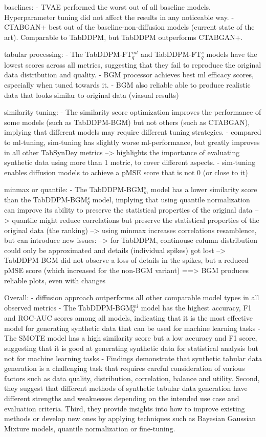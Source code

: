 baselines:
- TVAE performed the worst out of all baseline models. Hyperparameter tuning did not affect the results in any noticeable way.
- CTABGAN+ best out of the baseline-non-diffusion models (current state of the art). Comparable to TabDDPM, but TabDDPM outperforms CTABGAN+.


tabular processing:
- The TabDDPM-FT$^{ml}_q$ and TabDDPM-FT$^{s}_q$ models have the lowest scores across all metrics, suggesting that they fail to reproduce the original data distribution and quality.
- BGM processor achieves best ml efficacy scores, especially when tuned towards it.
- BGM also reliable able to produce realistic data that looks similar to original data (viasual results)


similarity tuning:
- The similarity score optimization improves the performance of some models (such as TabDDPM-BGM) but not others (such as CTABGAN), implying that different models may require different tuning strategies.
- compared to ml-tuning, sim-tuning has slightly worse ml-performance, but greatly improves in all other TabSynDey metrics --> highlights the importance of evaluating synthetic data using more than 1 metric, to cover different aspects.
- sim-tuning enables diffusion models to achieve a pMSE score that is not 0 (or close to it) 


minmax or quantile:
- The TabDDPM-BGM$^{s}_m$ model has a lower similarity score than the TabDDPM-BGM$^{s}_q$ model, implying that using quantile normalization can improve its ability to preserve the statistical properties of the original data
--> quantile might reduce correlations but preserve the statistical properties of the original data (the ranking)
--> using minmax increases correlations resamblence, but can introduce new issues:
	--> for TabDDPM, continouse column distribution could only be approximated and details (individual spikes) got lost
	--> TabDDPM-BGM did not observe a loss of details in the spikes, but a reduced pMSE score (which increased for the non-BGM variant)
	==> BGM produces reliable plots, even with changes

Overall:
- diffusion approach outperforms all other comparable model types in all observed metrics
- The TabDDPM-BGM$^{ml}_q$ model has the highest accuracy, F1 and ROC-AUC scores among all models, indicating that it is the most effective model for generating synthetic data that can be used for machine learning tasks
- The SMOTE model has a high similarity score but a low accuracy and F1 score, suggesting that it is good at generating synthetic data for statistical analysis but not for machine learning tasks
- Findings demonstrate that synthetic tabular data generation is a challenging task that requires careful consideration of various factors such as data quality, distribution, correlation, balance and utility. 
Second, they suggest that different methods of synthetic tabular data generation have different strengths and weaknesses depending on the intended use case and evaluation criteria. 
Third, they provide insights into how to improve existing methods or develop new ones by applying techniques such as Bayesian Gaussian Mixture models, quantile normalization or fine-tuning.





